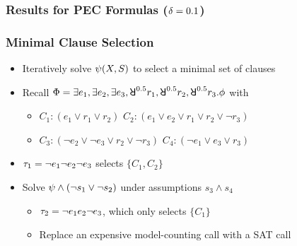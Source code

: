 \begin{frame}
    \frametitle{Results for PEC Formulas ($\delta=0.1$)}
    \begin{table}[ht]
        \centering
        \tiny
    \end{table}
\end{frame}

\begin{frame}
    \frametitle{Minimal Clause Selection}
    \begin{itemize}
        \item Iteratively solve $\psi(X,S)$ to select a minimal set of clauses
        \item Recall $\Qf=\exists e_1,\exists e_2,\exists e_3,\random{0.5} r_1,\random{0.5} r_2,\random{0.5} r_3.\pf$ with
              \begin{itemize}
                  \item[] $C_1: (e_1 \lor r_1 \lor r_2)$ $C_2: (e_1 \lor e_2 \lor r_1 \lor r_2 \lor \lnot r_3)$
                  \item[] $C_3: (\lnot e_2 \lor \lnot e_3 \lor r_2 \lor \lnot r_3)$ $C_4: (\lnot e_1 \lor e_3 \lor r_3)$
              \end{itemize}
        \item $\tau_1=\lnot e_1 \lnot e_2 \lnot e_3$ selects $\{C_1,C_2\}$
        \item Solve $\psi\land(\lnot s_1\lor\lnot s_2)$ under assumptions $s_3\land s_4$
              \begin{itemize}
                  \item $\tau_2=\lnot e_1 e_2 \lnot e_3$, which only selects $\{C_1\}$
                  \item Replace an expensive model-counting call with a SAT call
              \end{itemize}
    \end{itemize}
\end{frame}

